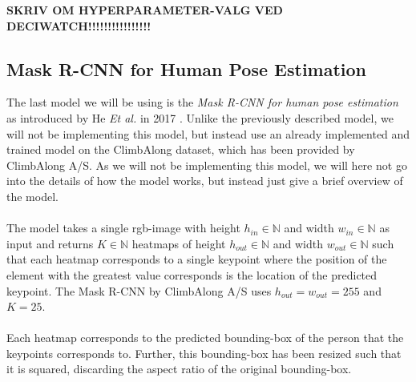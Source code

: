 \documentclass[./main.tex]{subfiles}
\begin{document}
\textbf{SKRIV OM HYPERPARAMETER-VALG VED DECIWATCH!!!!!!!!!!!!!!!!}

\subsection{Mask R-CNN for Human Pose Estimation}
The last model we will be using is the \textit{Mask R-CNN for human pose estimation} as introduced by He \textit{Et al.} in 2017 \cite{https://doi.org/10.48550/arxiv.1703.06870}. Unlike the previously described model, we will not be implementing this model, but instead use an already implemented and trained model on the ClimbAlong dataset, which has been provided by ClimbAlong A/S. As we will not be implementing this model, we will here not go into the details of how the model works, but instead just give a brief overview of the model.
\\
\\
The model takes a single rgb-image with height $h_{in} \in \mathbb{N}$ and width $w_{in} \in \mathbb{N}$ as input and returns $K \in \mathbb{N}$ heatmaps of height $h_{out} \in \mathbb{N}$ and width $w_{out} \in \mathbb{N}$ such that each heatmap corresponds to a single keypoint where the position of the element with the greatest value corresponds is the location of the predicted keypoint. The Mask R-CNN by ClimbAlong A/S uses $h_{out} = w_{out} = 255$ and $K = 25$.
\\
\\
Each heatmap corresponds to the predicted bounding-box of the person that the keypoints corresponds to. Further, this bounding-box has been resized such that it is squared, discarding the aspect ratio of the original bounding-box.
\end{document}
